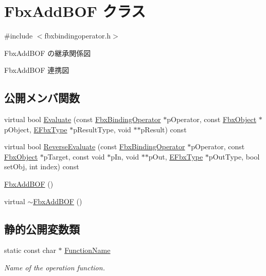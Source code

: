 \hypertarget{class_fbx_add_b_o_f}{}\section{Fbx\+Add\+B\+OF クラス}
\label{class_fbx_add_b_o_f}


{\ttfamily \#include $<$fbxbindingoperator.\+h$>$}



Fbx\+Add\+B\+OF の継承関係図


Fbx\+Add\+B\+OF 連携図
\subsection*{公開メンバ関数}
\begin{DoxyCompactItemize}
\item 
virtual bool \hyperlink{class_fbx_add_b_o_f_a2b1552f30e4ce028d9b67247ed3b9d06}{Evaluate} (const \hyperlink{class_fbx_binding_operator}{Fbx\+Binding\+Operator} $\ast$p\+Operator, const \hyperlink{class_fbx_object}{Fbx\+Object} $\ast$p\+Object, \hyperlink{fbxpropertytypes_8h_a73913a5ddfb20e57c6f25e9e6784bd92}{E\+Fbx\+Type} $\ast$p\+Result\+Type, void $\ast$$\ast$p\+Result) const
\item 
virtual bool \hyperlink{class_fbx_add_b_o_f_aee96f76da5722af28d12b65eefcc61bb}{Reverse\+Evaluate} (const \hyperlink{class_fbx_binding_operator}{Fbx\+Binding\+Operator} $\ast$p\+Operator, const \hyperlink{class_fbx_object}{Fbx\+Object} $\ast$p\+Target, const void $\ast$p\+In, void $\ast$$\ast$p\+Out, \hyperlink{fbxpropertytypes_8h_a73913a5ddfb20e57c6f25e9e6784bd92}{E\+Fbx\+Type} $\ast$p\+Out\+Type, bool set\+Obj, int index) const
\item 
\hyperlink{class_fbx_add_b_o_f_ac0950ff84a9d2e228949b29a14376dee}{Fbx\+Add\+B\+OF} ()
\item 
virtual \hyperlink{class_fbx_add_b_o_f_a20fa9c0da07357b512939e5c6732b62f}{$\sim$\+Fbx\+Add\+B\+OF} ()
\end{DoxyCompactItemize}
\subsection*{静的公開変数類}
\begin{DoxyCompactItemize}
\item 
static const char $\ast$ \hyperlink{class_fbx_add_b_o_f_a2929c676c1a89849156895fbe579fd4e}{Function\+Name}
\begin{DoxyCompactList}\small\item\em Name of the operation function. \end{DoxyCompactList}\end{DoxyCompactItemize}


